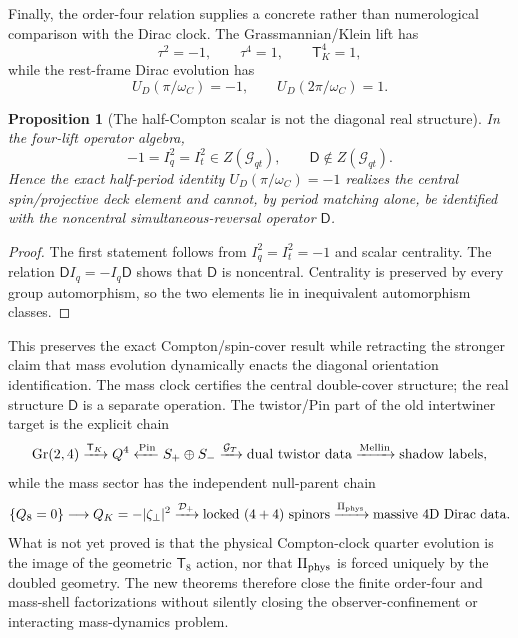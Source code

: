 \documentclass[11pt]{article}
\newcommand{\Gr}{\mathrm{Gr}}
\newtheorem{proposition}[theorem]{Proposition}
\theoremstyle{definition}\newtheorem{definition}[theorem]{Definition}
\theoremstyle{remark}\newtheorem{remark}[theorem]{Remark}\newtheorem{conjecture}[theorem]{Conjecture}
\begin{document}
Finally, the order-four relation supplies a concrete rather than numerological comparison with the Dirac clock. The Grassmannian/Klein lift has
\begin{equation}
 \tau^2=-1,\qquad \tau^4=1,\qquad \mathsf T_K^4=1,
\end{equation}
while the rest-frame Dirac evolution has
\begin{equation}
 U_D(\pi/\omega_C)=-1,\qquad U_D(2\pi/\omega_C)=1.
\end{equation}

\begin{proposition}[The half-Compton scalar is not the diagonal real structure]\label{prop:minusoneNotD}
In the four-lift operator algebra,
\begin{equation}
 -1=I_q^2=I_t^2\in Z(\mathcal G_{qt}),
 \qquad
 \mathsf D\notin Z(\mathcal G_{qt}).
\end{equation}
Hence the exact half-period identity $U_D(\pi/\omega_C)=-1$ realizes the central spin/projective deck element and cannot, by period matching alone, be identified with the noncentral simultaneous-reversal operator $\mathsf D$.
\end{proposition}
\begin{proof}
The first statement follows from $I_q^2=I_t^2=-1$ and scalar centrality. The relation $\mathsf D I_q=-I_q\mathsf D$ shows that $\mathsf D$ is noncentral. Centrality is preserved by every group automorphism, so the two elements lie in inequivalent automorphism classes.
\end{proof}
This preserves the exact Compton/spin-cover result while retracting the stronger claim that mass evolution dynamically enacts the diagonal orientation identification. The mass clock certifies the central double-cover structure; the real structure $\mathsf D$ is a separate operation.
The twistor/Pin part of the old intertwiner target is the explicit chain
\begin{equation}
 \Gr(2,4)\xrightarrow{\mathsf T_K}Q^4
 \xleftarrow{\rm Pin}S_+\oplus S_-
 \xrightarrow{\mathcal G_T}\text{dual twistor data}
 \xrightarrow{\rm Mellin}\text{shadow labels},
\end{equation}
while the mass sector has the independent null-parent chain
\begin{equation}
 \{Q_8=0\}\longrightarrow Q_K=-|\zeta_\perp|^2
 \xrightarrow{\mathcal D_+}\text{locked }(4+4)\text{ spinors}
 \xrightarrow{\Pi_{\rm phys}}\text{massive 4D Dirac data}.
\end{equation}
What is not yet proved is that the physical Compton-clock quarter evolution is the image of the geometric $\mathsf T_8$ action, nor that $\Pi_{\rm phys}$ is forced uniquely by the doubled geometry. The new theorems therefore close the finite order-four and mass-shell factorizations without silently closing the observer-confinement or interacting mass-dynamics problem.
\end{document}
